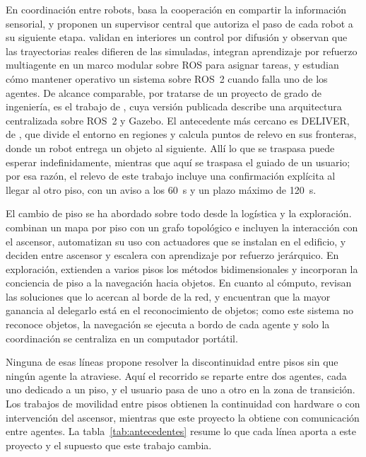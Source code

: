 En coordinación entre robots, \textcite{nair2024collaborative} basa la cooperación en compartir la información sensorial, y \textcite{roszkowska2023multilevel} proponen un supervisor central que autoriza el paso de cada robot a su siguiente etapa. \textcite{rudrusamy2022broadcast} validan en interiores un control por difusión y observan que las trayectorias reales difieren de las simuladas, \textcite{xu2026modular} integran aprendizaje por refuerzo multiagente en un marco modular sobre ROS para asignar tareas, y \textcite{zhang2025kubernetes} estudian cómo mantener operativo un sistema sobre ROS~2 cuando falla uno de los agentes. De alcance comparable, por tratarse de un proyecto de grado de ingeniería, es el trabajo de \textcite{piguave2023multirobot}, cuya versión publicada \autocite{yumbla2025open} describe una arquitectura centralizada sobre ROS~2 y Gazebo. El antecedente más cercano es DELIVER, de \textcite{srivastava2026deliver}, que divide el entorno en regiones y calcula puntos de relevo en sus fronteras, donde un robot entrega un objeto al siguiente. Allí lo que se traspasa puede esperar indefinidamente, mientras que aquí se traspasa el guiado de un usuario; por esa razón, el relevo de este trabajo incluye una confirmación explícita al llegar al otro piso, con un aviso a los 60~s y un plazo máximo de 120~s.

El cambio de piso se ha abordado sobre todo desde la logística y la exploración. \textcite{kim2024indoor} combinan un mapa por piso con un grafo topológico e incluyen la interacción con el ascensor, \textcite{song2024elevator} automatizan su uso con actuadores que se instalan en el edificio, y \textcite{luo2025elevator} deciden entre ascensor y escalera con aprendizaje por refuerzo jerárquico. En exploración, \textcite{chen2025lite} extienden a varios pisos los métodos bidimensionales y \textcite{gong2026stairway} incorporan la conciencia de piso a la navegación hacia objetos. En cuanto al cómputo, \textcite{tahir2025edge} revisan las soluciones que lo acercan al borde de la red, y \textcite{dordevic2023offloading} encuentran que la mayor ganancia al delegarlo está en el reconocimiento de objetos; como este sistema no reconoce objetos, la navegación se ejecuta a bordo de cada agente y solo la coordinación se centraliza en un computador portátil.

Ninguna de esas líneas propone resolver la discontinuidad entre pisos sin que ningún agente la atraviese. Aquí el recorrido se reparte entre dos agentes, cada uno dedicado a un piso, y el usuario pasa de uno a otro en la zona de transición. Los trabajos de movilidad entre pisos obtienen la continuidad con hardware o con intervención del ascensor, mientras que este proyecto la obtiene con comunicación entre agentes. La tabla~\ref{tab:antecedentes} resume lo que cada línea aporta a este proyecto y el supuesto que este trabajo cambia.


